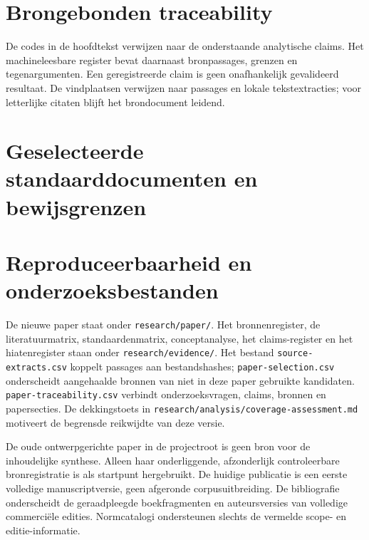\documentclass[11pt,a4paper]{article}
\begin{document}
\section{Brongebonden traceability}\label{app:claims}
De codes in de hoofdtekst verwijzen naar de onderstaande analytische claims. Het machineleesbare register bevat daarnaast bronpassages, grenzen en tegenargumenten. Een geregistreerde claim is geen onafhankelijk gevalideerd resultaat. De vindplaatsen verwijzen naar passages en lokale tekstextracties; voor letterlijke citaten blijft het brondocument leidend.

\section{Geselecteerde standaarddocumenten en bewijsgrenzen}

\section{Reproduceerbaarheid en onderzoeksbestanden}
De nieuwe paper staat onder \texttt{research/paper/}. Het bronnenregister, de literatuurmatrix, standaardenmatrix, conceptanalyse, het claims-register en het hiatenregister staan onder \texttt{research/evidence/}. Het bestand \texttt{source-extracts.csv} koppelt passages aan bestandshashes; \texttt{paper-selection.csv} onderscheidt aangehaalde bronnen van niet in deze paper gebruikte kandidaten. \texttt{paper-traceability.csv} verbindt onderzoeksvragen, claims, bronnen en papersecties. De dekkingstoets in \texttt{research/analysis/coverage-assessment.md} motiveert de begrensde reikwijdte van deze versie.

De oude ontwerpgerichte paper in de projectroot is geen bron voor de inhoudelijke synthese. Alleen haar onderliggende, afzonderlijk controleerbare bronregistratie is als startpunt hergebruikt. De huidige publicatie is een eerste volledige manuscriptversie, geen afgeronde corpusuitbreiding. De bibliografie onderscheidt de geraadpleegde boekfragmenten en auteursversies van volledige commerciële edities. Normcatalogi ondersteunen slechts de vermelde scope- en editie-informatie.
\printbibliography[title={Referenties}]
\end{document}
